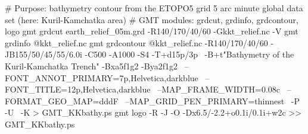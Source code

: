 # Purpose: bathymetry contour from the ETOPO5 grid 5 arc minute global data set (here: Kuril-Kamchatka area)
# GMT modules: grdcut, grdinfo, grdcontour, logo
gmt grdcut earth_relief_05m.grd -R140/170/40/60 -Gkkt_relief.nc -V
gmt grdinfo @kkt_relief.nc
gmt grdcontour @kkt_relief.nc -R140/170/40/60 -JB155/50/45/55/6.0i -C500 -A1000 -S4 -T+d15p/3p \
	-B+t"Bathymetry of the Kuril-Kamchatka Trench" -Bxa5f1g2 -Bya2f1g2 \
	--FONT_ANNOT_PRIMARY=7p,Helvetica,darkblue \
	--FONT_TITLE=12p,Helvetica,darkblue \
	--MAP_FRAME_WIDTH=0.08c \
	--FORMAT_GEO_MAP=dddF \
	--MAP_GRID_PEN_PRIMARY=thinnest \
	-P -U \
	-K > GMT_KKbathy.ps
gmt logo -R -J -O -Dx6.5/-2.2+o0.1i/0.1i+w2c  >> GMT_KKbathy.ps